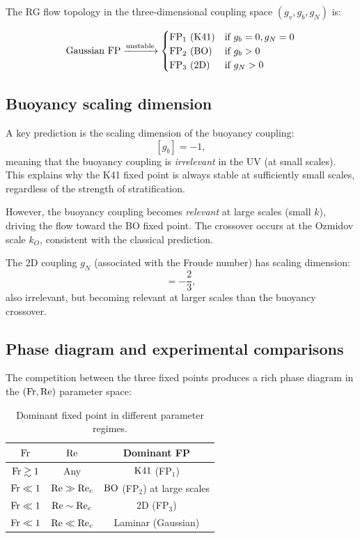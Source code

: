 The RG flow topology in the three-dimensional coupling space $(g_v, g_b, g_N)$ is:

{\scriptsize
\begin{equation} \label{eq:strat_flow}
\text{Gaussian FP} \xrightarrow{\text{unstable}} \begin{cases} \text{FP}_1~(\text{K41}) & \text{if } g_b=0, g_N=0 \\ \text{FP}_2~(\text{BO}) & \text{if } g_b > 0 \\ \text{FP}_3~(\text{2D}) & \text{if } g_N > 0 \end{cases}
\end{equation}
}

\subsection{Buoyancy scaling dimension}

A key prediction is the scaling dimension of the buoyancy coupling:
\begin{equation}\label{eq:buoyancy_dimension}
\boxed{[g_b] = -1,}
\end{equation}
meaning that the buoyancy coupling is \emph{irrelevant} in the UV (at small scales). This explains why the K41 fixed point is always stable at sufficiently small scales, regardless of the strength of stratification.

However, the buoyancy coupling becomes \emph{relevant} at large scales (small $k$), driving the flow toward the BO fixed point. The crossover occurs at the Ozmidov scale $k_O$, consistent with the classical prediction.

The 2D coupling $g_N$ (associated with the Froude number) has scaling dimension:
\begin{equation}
[g_N] = -\frac{2}{3},
\end{equation}
also irrelevant, but becoming relevant at larger scales than the buoyancy crossover.

\subsection{Phase diagram and experimental comparisons}

The competition between the three fixed points produces a rich phase diagram in the $(\mathrm{Fr}, \mathrm{Re})$ parameter space:

\begin{table}[ht]
\centering \small
\caption{Dominant fixed point in different parameter regimes.}\label{tab:strat_phases}
\begin{ruledtabular}
\begin{tabular}{ccc}
\hline\hline
$\mathrm{Fr}$ & $\mathrm{Re}$ & Dominant FP \\
\hline
$\mathrm{Fr} \gtrsim 1$ & Any & $\text{K41}$ (FP$_1$) \\
$\mathrm{Fr} \ll 1$ & $\mathrm{Re} \gg \mathrm{Re}_c$ & $\text{BO}$ (FP$_2$) at large scales \\
$\mathrm{Fr} \ll 1$ & $\mathrm{Re} \sim \mathrm{Re}_c$ & 2D (FP$_3$) \\
$\mathrm{Fr} \ll 1$ & $\mathrm{Re} \ll \mathrm{Re}_c$ & Laminar (Gaussian) \\
\hline\hline
\end{tabular}
\end{ruledtabular}
\end{table}

